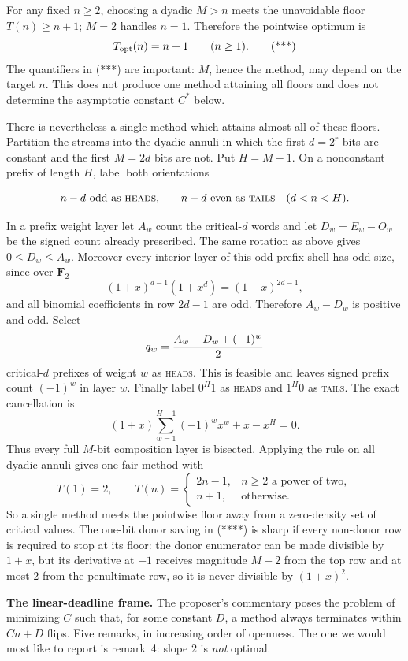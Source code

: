 \documentclass[11pt]{article}
\theoremstyle{remark}
\newcommand{\head}{\textnormal{\textsc{heads}}}
\newcommand{\tail}{\textnormal{\textsc{tails}}}
\begin{document}
For any fixed $n\ge2$, choosing a dyadic $M>n$ meets the unavoidable floor
$T(n)\ge n+1$; $M=2$ handles $n=1$.  Therefore the pointwise optimum is
\[
                         T_{\rm opt}(n)=n+1\qquad(n\ge1).    \tag{***}
\]
The quantifiers in (***) are important: $M$, hence the method, may depend on
the target $n$.  This does not produce one method attaining all floors and
does not determine the asymptotic constant $C^*$ below.

There is nevertheless a single method which attains almost all of these
floors.  Partition the streams into the dyadic annuli in which the first
$d=2^r$ bits are constant and the first $M=2d$ bits are not.  Put
$H=M-1$.  On a nonconstant prefix of length $H$, label both orientations

\[
 n-d\text{ odd as \head,}\qquad n-d\text{ even as \tail}
 \quad(d<n<H).
\]

In a prefix weight layer let $A_w$ count the critical-$d$ words and let
$D_w=E_w-O_w$ be the signed count already prescribed.  The same rotation as
above gives $0\le D_w\le A_w$.  Moreover every interior layer of this odd
prefix shell has odd size, since over $\mathbf F_2$
\[
 (1+x)^{d-1}(1+x^d)=(1+x)^{2d-1},
\]
and all binomial coefficients in row $2d-1$ are odd.  Therefore
$A_w-D_w$ is positive and odd.  Select
\[
 q_w={A_w-D_w+(-1)^w\over2}
\]
critical-$d$ prefixes of weight $w$ as \head.  This is feasible and leaves
signed prefix count $(-1)^w$ in layer $w$.  Finally label
$0^H1$ as \head{} and $1^H0$ as \tail.  The exact cancellation is
\[
 (1+x)\sum_{w=1}^{H-1}(-1)^w x^w+x-x^H=0.
\]
Thus every full $M$-bit composition layer is bisected.  Applying the rule on
all dyadic annuli gives one fair method with
\[
 T(1)=2,\qquad
 T(n)=\begin{cases}2n-1,&n\ge2\text{ a power of two},\\
                    n+1,&\text{otherwise}.
       \end{cases}                                             \tag{****}
\]
So a single method meets the pointwise floor away from a zero-density set of
critical values.  The one-bit donor saving in (****) is sharp if every
non-donor row is required to stop at its floor: the donor enumerator can be
made divisible by $1+x$, but its derivative at $-1$ receives magnitude
$M-2$ from the top row and at most $2$ from the penultimate row, so it is
never divisible by $(1+x)^2$.

\medskip
\noindent\textbf{The linear-deadline frame.}
The proposer's commentary poses the problem of minimizing $C$ such that, for
some constant $D$, a method always terminates within $Cn+D$ flips. Five
remarks, in increasing order of openness. The one we would most like to
report is remark~4: slope $2$ is \emph{not} optimal.
\end{document}
